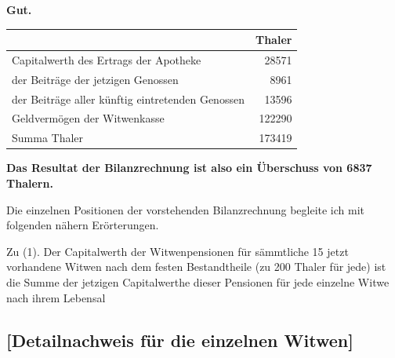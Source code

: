 \documentclass[12pt,a4paper]{article}
\begin{document}
\begin{center}
\textbf{Gut.}
\end{center}

\begin{center}
\begin{tabular}{|l|r|}
\hline
 & Thaler \\
\hline
Capitalwerth des Ertrags der Apotheke & 28571 \quad\quad \\
\quad der Beiträge der jetzigen Genossen & 8961 \quad\quad \\
\quad der Beiträge aller künftig eintretenden Genossen & 13596 \quad\quad \\
Geldvermögen der Witwenkasse & 122290 \quad\quad \\
\hline
Summa Thaler & 173419 \quad\quad \\
\hline
\end{tabular}
\end{center}

\begin{center}
\textbf{Das Resultat der Bilanzrechnung ist also ein Überschuss von 6837 Thalern.}
\end{center}

Die einzelnen Positionen der vorstehenden Bilanzrechnung begleite ich mit folgenden nähern Erörterungen.

Zu (1). Der Capitalwerth der Witwenpensionen für sämmtliche 15 jetzt vorhandene Witwen nach dem festen Bestandtheile (zu 200 Thaler für jede) ist die Summe der jetzigen Capitalwerthe dieser Pensionen für jede einzelne Witwe nach ihrem Lebensal

\subsection*{[Detailnachweis für die einzelnen Witwen]}
\end{document}
